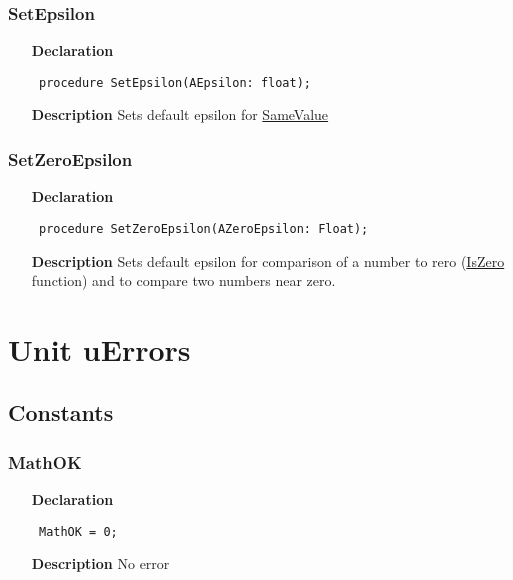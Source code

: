 \documentclass[12pt,a4paper,oneside]{report}
\newcommand{\lmath}[1]{   %
	\marginpar{\vspace{#1} 
		\begin{flushright}
			LMath
	\end{flushright} }
}
\newcommand{\declarationitem}[1]{\textbf{#1}}
\newcommand{\descriptiontitle}[1]{\textbf{#1}}
\newcommand{\code}[1]{\texttt{#1}}
\begin{document}
\subsubsection{SetEpsilon}
\lmath{-24pt}
\label{utypes-SetEpsilon}
\begin{itemize}\item[\declarationitem{Declaration}\hfill]
	\begin{flushleft}
		\code{
			procedure SetEpsilon(AEpsilon: float);}
		
	\end{flushleft}
	
	\par
	\item[\descriptiontitle{Description}]
	Sets default epsilon for \hyperref[utypes-SameValue]{SameValue}
	
\end{itemize}
\subsubsection{SetZeroEpsilon}
\lmath{-24pt}
\label{utypes-SetZeroEpsilon}
\begin{itemize}\item[\declarationitem{Declaration}\hfill]
	\begin{flushleft}
		\code{
			procedure SetZeroEpsilon(AZeroEpsilon: Float);}
		
	\end{flushleft}
	
	\par
	\item[\descriptiontitle{Description}]
	Sets default epsilon for comparison of a number to rero (\hyperref[utypes-IsZero]{IsZero} function) and to compare two numbers near zero.
	
\end{itemize}


\section{Unit uErrors}
\label{uErrors}
\subsection{Constants}
\subsubsection{MathOK}
\label{uErrors-MathOK}
\begin{itemize}\item[\declarationitem{Declaration}\hfill]
	\begin{flushleft}
		\code{
			MathOK = 0;}
		
	\end{flushleft}
	
	\par
	\item[\descriptiontitle{Description}]
	No error
	
\end{itemize}
\end{document}
